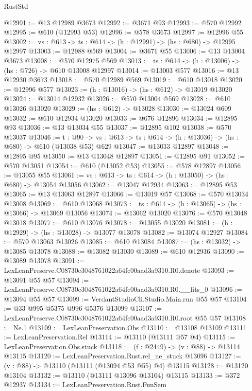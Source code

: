 \begin{lexlean}{RustStd}
\begin{coremodule}
@12991 := @13 @12989 @3673
@12992 := @3671 @93
@12993 := @570 @12992
@12995 := @610 (@12993 @53)
@12996 := @578 @3673
@12997 := @12996 @55
@13002 := {vs : @613} -> {ts : @614} -> (h : @12991) -> (hs : @680) -> @12995 @12997
@13003 := @12988 @569
@13004 := @3671 @55
@13006 := @13 @13004 @3673
@13008 := @570 @12975 @569
@13013 := {ts : @614} -> (h : @13006) -> (hs : @726) -> @610 @13008 @12997
@13014 := @13003 @577
@13016 := @13 @12930 @3673
@13018 := @570 @12989 @569
@13019 := @610 @13018
@13020 := @12996 @577
@13023 := (h : @13016) -> (hs : @612) -> @13019 @13020
@13024 := @13014 @12932
@13026 := @570 @13004 @569
@13028 := @610 @13026 @13020
@13029 := (hs : @612) -> @13028
@13030 := @13024 @609
@13032 := @610 @12934 @13020
@13033 := @676 @12896
@13034 := @12895 @93
@13036 := @13 @13034 @55
@13037 := @12895 @102
@13038 := @570 @13037
@13046 := {t : @90} ->
  {vs : @613} -> {ts : @614} -> (h : @13036) -> (hs : @680) -> @610 (@13038 @53) @629
@13047 := @13033 @12897
@13048 := @12895 @95
@13050 := @13 @13048 @12897
@13051 := @12895 @91
@13052 := @570 @13051
@13054 := @610 (@13052 @53)
@13055 := @578 @12897
@13056 := @13055 @55
@13061 := {vs : @613} -> {ts : @614} -> (h : @13050) -> (hs : @680) -> @13054 @13056
@13062 := @13047 @12934
@13063 := @12895 @53
@13065 := @13 @13063 @12897
@13066 := @13019 @57
@13068 := @570 @13034 @13008
@13069 := @610 @13068
@13073 := {ts : @614} -> (h : @13065) -> (hs : @13066) -> @13069 @13056
@13074 := @13062 @13020
@13076 := @570 @13048 @13018
@13077 := @610 @13076
@13078 := @13055 @13020
@13081 := (h : @12929) -> (hs : @13028) -> @13077 @13078
@13082 := @13074 @12927
@13084 := @570 @13063 @13026
@13085 := @610 @13084
@13087 := (hs : @13032) -> @13085 @13078
@13088 := @13082 @13030
@13089 := @610 @12936
@13090 := @13089 @13078
@13091 := LexLeanPreserve.C08730c3048761022a64fc00aad3a9310.R0.denote
@13093 := @13091 @55 @57
@13094 := LexLeanPreserve.C08730c3048761022a64fc00aad3a9310.R0.__fits_0
@13096 := @13094 @55 @57
@13099 := VerdantStudioCli.Studio.Main.run @55 @57
@13104 := @33 @995 @5375 @996 @5376 @13099
@13107 := LexLeanPreserve.C08730c3048761022a64fc00aad3a9310.R0.root @55 @57
@13108 := Ne.{1}
@13109 := LexLeanPreservation.Obs
@13110 := @13108 @13109
@13111 := LexLeanPreservation.Rel
@13114 := @13110 (@13111 @57 @4)
@13115 := LexLeanPreservation.Obs.stuck
@13118 := (f : @2449) -> (v : @88) -> @13114 @13115
@13120 := LexLeanPreservation.Rust.rel_ne_stuck @13096
@13127 := (v : @88) -> @13110 (@13111 (@13094 @53 @55) @4) @13115
@13128 := @13120 @13104
@13132 := @13110 (@13111 @13096 @13104) @13115
@13133 := @372 @12937
@13134 := LexLeanPreservation.Rust.FunSem

\end{coremodule}
\end{lexlean}
